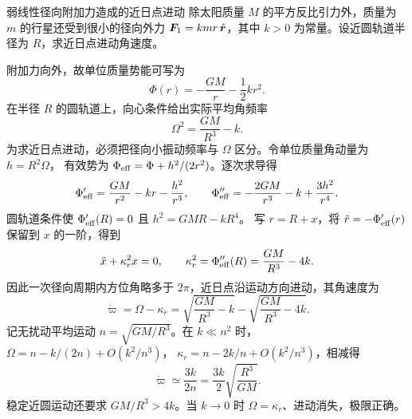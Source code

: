 \begin{origexamplebox}{弱线性径向附加力造成的近日点进动}
\label{ch11:ex:07}
除太阳质量 $M$ 的平方反比引力外，质量为 $m$ 的行星还受到很小的径向外力
$\bm{F}_1=kmr\,\hat{\bm{r}}$，其中 $k>0$ 为常量。设近圆轨道半径为 $R$，求近日点进动角速度。

\ThQPrecession
\end{origexamplebox}
\begin{xesolution}
\ThAPrecession

附加力向外，故单位质量势能可写为
\[
 \Phi(r)=-\frac{GM}{r}-\frac12kr^2.
\]
在半径 $R$ 的圆轨道上，向心条件给出实际平均角频率
\[
 \boxed{\Omega^2=\frac{GM}{R^3}-k}.
\]
为求近日点进动，必须把径向小振动频率与 $\Omega$ 区分。令单位质量角动量为 $h=R^2\Omega$，
有效势为 $\Phi_{\rm eff}=\Phi+h^2/(2r^2)$。逐次求导得
\[
 \Phi_{\rm eff}'=\frac{GM}{r^2}-kr-\frac{h^2}{r^3},\qquad
 \Phi_{\rm eff}''=-\frac{2GM}{r^3}-k+\frac{3h^2}{r^4}.
\]
圆轨道条件使 $\Phi_{\rm eff}'(R)=0$ 且 $h^2=GMR-kR^4$。
写 $r=R+x$，将 $\ddot r=-\Phi_{\rm eff}'(r)$ 保留到 $x$ 的一阶，得到
\[
 \ddot x+\kappa_r^2x=0,
 \qquad
 \kappa_r^2=\Phi_{\rm eff}''(R)
 =\frac{GM}{R^3}-4k.
\]
因此一次径向周期内方位角略多于 $2\pi$，近日点沿运动方向进动，其角速度为
\[
 \boxed{\dot\varpi=\Omega-\kappa_r
 =\sqrt{\frac{GM}{R^3}-k}
 -\sqrt{\frac{GM}{R^3}-4k}}.
\]
记无扰动平均运动 $n=\sqrt{GM/R^3}$。在 $k\ll n^2$ 时，
$\Omega=n-k/(2n)+O(k^2/n^3)$，
$\kappa_r=n-2k/n+O(k^2/n^3)$，相减得
\[
 \boxed{\dot\varpi\simeq\frac{3k}{2n}
 =\frac{3k}{2}\sqrt{\frac{R^3}{GM}}}.
\]
稳定近圆运动还要求 $GM/R^3>4k$。当 $k\to0$ 时 $\Omega=\kappa_r$、进动消失，极限正确。
\end{xesolution}

